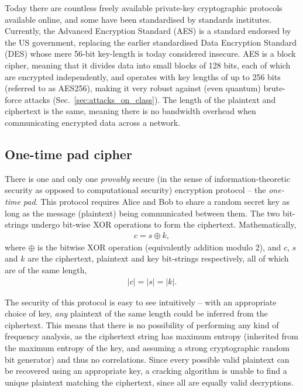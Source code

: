 Today there are countless freely available private-key cryptographic protocols available online, and some have been standardised by standards institutes. Currently, the Advanced Encryption Standard (AES) is a standard endorsed by the US government, replacing the earlier standardised Data Encryption Standard (DES) whose mere 56-bit key-length is today considered insecure. AES is a block cipher, meaning that it divides data into small blocks of 128 bits, each of which are encrypted independently, and operates with key lengths of up to 256 bits (referred to as AES256), making it very robust against (even quantum) brute-force attacks (Sec.~\ref{sec:attacks_on_class}). The length of the plaintext and ciphertext is the same, meaning there is no bandwidth overhead when communicating encrypted data across a network.

%
%

\subsection{One-time pad cipher}

There is one and only one \textit{provably} secure (in the sense of information-theoretic security as opposed to computational security) encryption protocol -- the \textit{one-time pad}. This protocol requires Alice and Bob to share a random secret key as long as the message (plaintext) being communicated between them. The two bit-strings undergo bit-wise XOR operations to form the ciphertext. Mathematically,
\begin{align}
c = s \oplus k,
\end{align}
where $\oplus$ is the bitwise XOR operation (equivalently addition modulo 2), and $c$, $s$ and $k$ are the ciphertext, plaintext and key bit-strings respectively, all of which are of the same length,
\begin{align}
	|c|=|s|=|k|.
\end{align}

The security of this protocol is easy to see intuitively -- with an appropriate choice of key, \textit{any} plaintext of the same length could be inferred from the ciphertext. This means that there is no possibility of performing any kind of frequency analysis, as the ciphertext string has maximum entropy (inherited from the maximum entropy of the key, and assuming a strong cryptographic random bit generator) and thus no correlations. Since every possible valid plaintext can be recovered using an appropriate key, a cracking algorithm is unable to find a unique plaintext matching the ciphertext, since all are equally valid decryptions.

